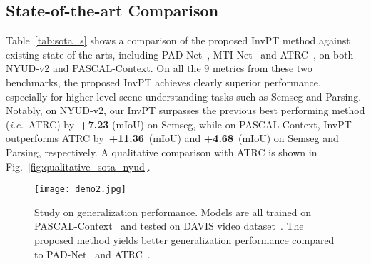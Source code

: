 \documentclass[runningheads]{llncs}
\newcommand*{\ie}{\emph{i.e.}}
\begin{document}
\subsection{State-of-the-art Comparison}
Table~\ref{tab:sota_s} shows a comparison of the proposed InvPT method against existing state-of-the-arts, including PAD-Net~\cite{padnet}, MTI-Net~\cite{mti} and ATRC~\cite{atrc}, on both NYUD-v2 and PASCAL-Context.
On all the 9 metrics from these two benchmarks, the proposed InvPT achieves clearly superior performance, especially for higher-level scene understanding tasks such as Semseg and Parsing.
Notably, on NYUD-v2, our InvPT surpasses the previous best performing method (\ie~ATRC) by~\textbf{+7.23} (mIoU) on Semseg,
while on PASCAL-Context, InvPT outperforms ATRC by~\textbf{+11.36}~(mIoU) and \textbf{+4.68}~(mIoU) on Semseg and Parsing, respectively.
A qualitative comparison with ATRC is shown in Fig.~\ref{fig:qualitative_sota_nyud}.

\begin{figure}[!t]
	\centering
	\texttt{[image: demo2.jpg]}
	\vspace{-8pt}
    \caption{Study on generalization performance. Models are all trained on PASCAL-Context~\cite{chen2014detect} and tested on DAVIS video dataset~\cite{davis}. The proposed method yields better generalization performance compared to PAD-Net~\cite{padnet} and ATRC~\cite{atrc}.
 	}
 	\label{fig:demo}
	\vspace{-15pt}
\end{figure}
\end{document}
